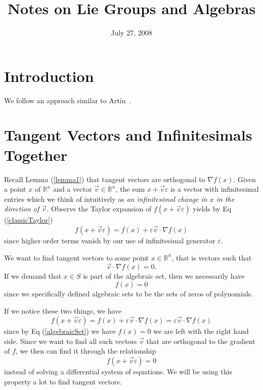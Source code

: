 \documentclass[final]{amsart}
\title{Notes on Lie Groups and Algebras}
\date{July 27, 2008}
\begin{document}
\maketitle
\tableofcontents
\section{Introduction}

We follow an approach similar to Artin~\cite{ArtinBk01}.




\section{Tangent Vectors and Infinitesimals Together}

Recall Lemma (\ref{lemma1}) that tangent vectors are orthogonal to $\nabla f(x)$.
Given a point $x$ of $\mathbb{R}^n$ and a vector $\vec{v}\in\mathbb{R}^n$, the
sum $x + \vec{v}\varepsilon$ is a vector with infinitesimal entries which we
think of intuitively as \emph{an infinitesimal change in $x$ in the direction of
$\vec{v}$.} Observe the Taylor expansion of $f(x + \vec{v}\varepsilon)$ yields by
Eq (\ref{classicTaylor})
\begin{equation}
f(x + \vec{v}\varepsilon) = f(x) + \varepsilon\vec{v}\cdot\nabla f(x)
\end{equation}
since higher order terms vanish by our use of infinitesimal generator $\varepsilon$.

We want to find tangent vectors to some point $x\in\mathbb{R}^n$, that is vectors such that
\begin{equation}
\vec{v}\cdot\nabla f(x) = 0.
\end{equation}
If we demand that $x\in S$ is part of the algebraic set, then we necessarily
have
\begin{equation}\label{algebraicSet}
f(x) = 0
\end{equation}
since we specifically defined algebraic sets to be the sets of zeros of 
polynomials.

If we notice these two things, we have
\begin{equation}
f(x + \vec{v}\varepsilon) = f(x) + \varepsilon\vec{v}\cdot\nabla f(x) = \varepsilon\vec{v}\cdot\nabla f(x)
\end{equation}
since by Eq (\ref{algebraicSet}) we have $f(x)=0$ we are left with the right
hand side. Since we want to find all such vectors $\vec{v}$ that are orthogonal
to the gradient of $f$, we then can find it through the relationship
\begin{equation}
f(x + \vec{v}\varepsilon) = 0
\end{equation}
instead of solving a differential system of equations. We will be using this 
property a lot to find tangent vectors.
\end{document}
